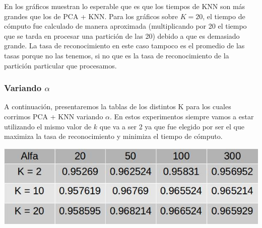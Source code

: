 En los gráficos muestran lo esperable que es que los tiempos de KNN son más grandes que los de PCA + KNN. Para los gráficos sobre $K = 20$, el tiempo de cómputo fue calculado de manera aproximada (multiplicando por 20 el tiempo que se tarda en procesar una partición de las 20) debido a que es demasiado grande. La tasa de reconocimiento en este caso tampoco es el promedio de las tasas porque no las tenemos, si no que es la tasa de reconocimiento de la partición particular que procesamos.

\subsubsection{Variando $\alpha$}
A continuación, presentaremos la tablas de los distintos K para los cuales corrimos PCA + KNN variando $\alpha$. En estos experimentos siempre vamos a estar utilizando el mismo valor de $k$ que va a ser 2 ya que fue elegido por ser el que maximiza la tasa de reconocimiento y minimiza el tiempo de cómputo.
\newline
\newline
\centerline{
\includegraphics[scale=0.4]{Tablas/variandoAlfas.jpg}
}

